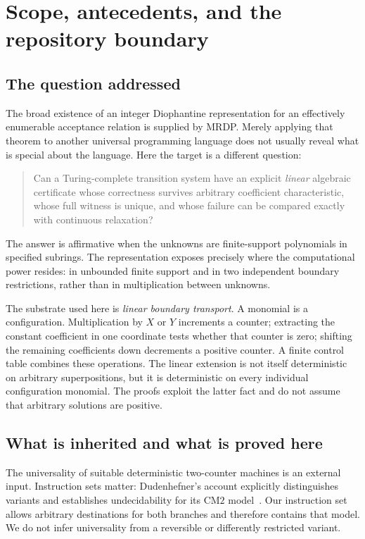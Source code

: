 \documentclass[11pt,letterpaper]{article}
\numberwithin{equation}{section}
\theoremstyle{definition}
\begin{document}
\section{Scope, antecedents, and the repository boundary}\label{pwh:bt:sec:scope}

\subsection{The question addressed}
The broad existence of an integer Diophantine representation for an
effectively enumerable acceptance relation is supplied by MRDP. Merely
applying that theorem to another universal programming language does not
usually reveal what is special about the language. Here the target is a
different question:
\begin{quote}
Can a Turing-complete transition system have an explicit \emph{linear}
algebraic certificate whose correctness survives arbitrary coefficient
characteristic, whose full witness is unique, and whose failure can be
compared exactly with continuous relaxation?
\end{quote}
The answer is affirmative when the unknowns are finite-support
polynomials in specified subrings. The representation exposes precisely
where the computational power resides: in unbounded finite support and
in two independent boundary restrictions, rather than in multiplication
between unknowns.

The substrate used here is \emph{linear boundary transport}. A monomial
is a configuration. Multiplication by $X$ or $Y$ increments a counter;
extracting the constant coefficient in one coordinate tests whether that
counter is zero; shifting the remaining coefficients down decrements a
positive counter. A finite control table combines these operations. The
linear extension is not itself deterministic on arbitrary superpositions,
but it is deterministic on every individual configuration monomial. The
proofs exploit the latter fact and do not assume that arbitrary solutions
are positive.

\subsection{What is inherited and what is proved here}
The universality of suitable deterministic two-counter machines is an
external input. Instruction sets matter: Dudenhefner's account explicitly
distinguishes variants and establishes undecidability for its $\mathrm{CM2}$
model~\cite{bt:dudenhefner}. Our instruction set allows arbitrary destinations
for both branches and therefore contains that model. We do not infer
universality from a reversible or differently restricted variant.
\end{document}
